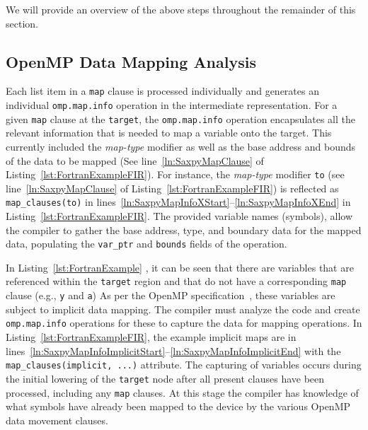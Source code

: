 \documentclass[acmtog,natbib=false]{acmart}
\newcommand{\code}[1]{\texttt{#1}\xspace}
\begin{document}
We will provide an overview of the above steps throughout the remainder of this section.

\subsection{OpenMP Data Mapping Analysis}
\label{sec:OpenMPDataMappingAnalysis}

Each list item in a \code{map} clause is processed individually and generates an individual \code{omp.map.info} operation in the intermediate representation. 
For a given \code{map} clause at the \code{target}, the \code{omp.map.info} operation encapsulates all the relevant information that is needed to map a variable onto the target.
This currently included the \textit{map-type} modifier as well as the base address and bounds of the data to be mapped (See line~\ref{ln:SaxpyMapClause} of Listing~\ref{lst:FortranExampleFIR}).
For instance, the \textit{map-type} modifier \code{to} (see line~\ref{ln:SaxpyMapClause} of Listing~\ref{lst:FortranExampleFIR}) is reflected as \code{map\_clauses(to)} in lines~\ref{ln:SaxpyMapInfoXStart}--\ref{ln:SaxpyMapInfoXEnd} in Listing~\ref{lst:FortranExampleFIR}.
The provided variable names (symbols), allow the compiler to gather the base address, type, and boundary data for the mapped data, populating the \code{var\_ptr} and \code{bounds} fields of the operation. 

In Listing~\ref{lst:FortranExample}
, it can be seen that there are variables that are referenced within the \code{target} region and that do not have a corresponding \code{map} clause (e.g., \code{y} and \code{a})
As per the OpenMP specification~\cite{OARB24}, these variables are subject to implicit data mapping.
The compiler must analyze the code and create \code{omp.map.info} operations for these to capture the data for mapping operations. 
In Listing~\ref{lst:FortranExampleFIR}, the example implicit maps are in lines~\ref{ln:SaxpyMapInfoImplicitStart}--\ref{ln:SaxpyMapInfoImplicitEnd} with the \code{map\_clauses(implicit, ...)} attribute.
The capturing of variables occurs during the initial lowering of the \code{target} node after all present clauses have been processed, including any \code{map} clauses. 
At this stage the compiler has knowledge of what symbols have already been mapped to the device by the various OpenMP data movement clauses.
\end{document}
